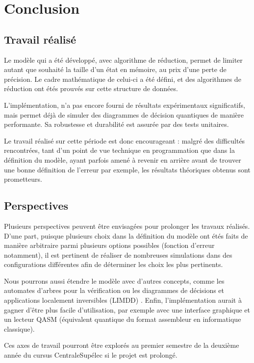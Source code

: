 
\chapter{Conclusion} %
\label{ch:Conclusion}

\section{Travail réalisé}

Le modèle qui a été développé, avec algorithme de réduction, permet de limiter autant que souhaité la taille d'un état en mémoire, au prix d'une perte de précision. Le cadre mathématique de celui-ci a été défini, et des algorithmes de réduction ont étés prouvés sur cette structure de données.

L'implémentation, n'a pas encore fourni de résultats expérimentaux significatifs, mais permet déjà de simuler des diagrammes de décision quantiques de manière performante. Sa robustesse et durabilité est assurée par des tests unitaires.

Le travail réalisé sur cette période est donc encourageant : malgré des difficultés rencontrées, tant d'un point de vue technique en programmation que dans la définition du modèle, ayant parfois amené à revenir en arrière avant de trouver une bonne définition de l'erreur par exemple, les résultats théoriques obtenus sont prometteurs.

\section{Perspectives}

Plusieurs perspectives peuvent être envisagées pour prolonger les travaux réalisés. D'une part, puisque plusieurs choix dans la définition du modèle ont étés faits de manière arbitraire parmi plusieurs options possibles (fonction d'erreur notamment), il est pertinent de réaliser de nombreuses simulations dans des configurations différentes afin de déterminer les choix les plus pertinents.

Nous pourrons aussi étendre le modèle avec d'autres concepts, comme les automates d'arbres pour la vérification \cite{chen2023automatabased} ou les diagrammes de décisions et applications localement inversibles (LIMDD) \cite{Vinkhuijzen_2023}. Enfin, l'implémentation aurait à gagner d'être plus facile d'utilisation, par exemple avec une interface graphique et un lecteur QASM (équivalent quantique du format assembleur en informatique classique).

Ces axes de travail pourront être explorés au premier semestre de la deuxième année du cursus CentraleSupélec si le projet est prolongé.